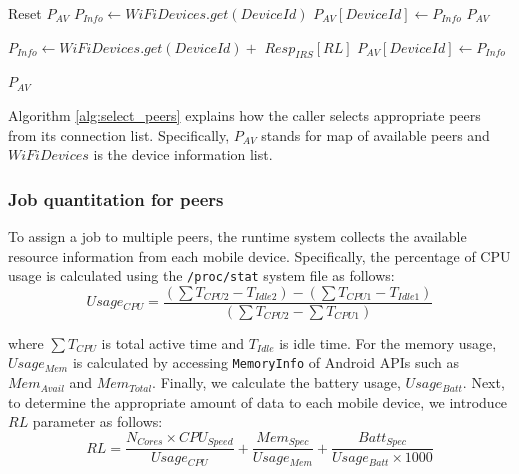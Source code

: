\documentclass{sig-alternate}[10pt]
\begin{document}
\begin{CCSXML}
\begin{algorithm}
\begin{algorithmic}[1]
\begin{scriptsize}
  	\State Reset $P_{AV}$ 
  	\State $P_{Info} \leftarrow WiFiDevices.get(DeviceId)$
  	\State $P_{AV}[DeviceId] \leftarrow P_{Info}$
  	\State \Return $P_{AV}$
  \EndIf

  	\State $P_{Info} \leftarrow WiFiDevices.get(DeviceId) + $
		\State
			\hspace{\algorithmicindent}
			\hspace{\algorithmicindent}
			\hspace{\algorithmicindent}
			\hspace{\algorithmicindent}
			$Resp_{IRS}[RL]$
  	\State $P_{AV}[DeviceId] \leftarrow P_{Info}$
  \EndIf
\EndFor

\State \Return $P_{AV}$
\EndFunction
\end{scriptsize}
\end{algorithmic}

\end{algorithm}

Algorithm \ref{alg:select_peers} explains how the caller selects appropriate peers from its connection list. Specifically, $P_{AV}$ stands for map of available peers and $WiFiDevices$ is the device information list.\\

\subsubsection{Job quantitation for peers}\label{ss_jqfp}
To assign a job to multiple peers, the runtime system collects the available resource information from each mobile device. Specifically, the percentage of CPU usage is calculated using the \texttt{/proc/stat} system file as follows:
\begin{equation}
\label{eq:cpu_usage}
Usage_{CPU} = \frac{(\sum{T_{CPU2}} - T_{Idle2}) - (\sum{T_{CPU1}} - T_{Idle1})}{(\sum{T_{CPU2}} - \sum{T_{CPU1}})}
\end{equation}

\noindent where $\sum{T_{CPU}}$ is total active time and $T_{Idle}$ is idle time. For the memory usage, $Usage_{Mem}$ is calculated by accessing \texttt{MemoryInfo} of Android APIs such as $Mem_{Avail}$ and $Mem_{Total}$. Finally, we  calculate the battery usage, $Usage_{Batt}$. Next, to determine the appropriate amount of data to each mobile device, we introduce $RL$ parameter as follows:
\begin{equation}
\label{eq:res_level}
RL = \frac{N_{Cores} \times CPU_{Speed}}{Usage_{CPU}} + \frac{Mem_{Spec}}{Usage_{Mem}} + \frac{Batt_{Spec}}{Usage_{Batt} \times 1000}
\end{equation}


\end{CCSXML}
\end{document}
